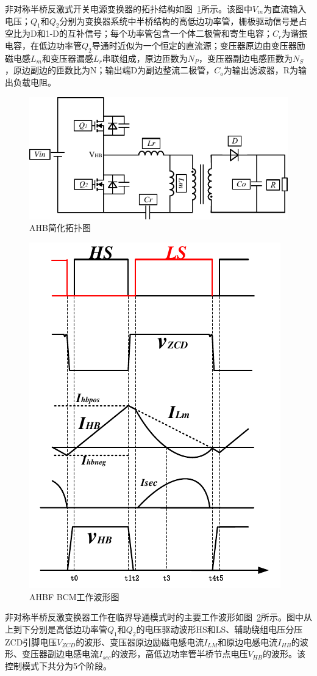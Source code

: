 非对称半桥反激式开关电源变换器的拓扑结构如图~\ref{fig:AHB简化拓扑图}所示。该图中$V_{in}$为直流输入电压；$Q_1$和$Q_2$分别为变换器系统中半桥结构的高低边功率管，栅极驱动信号是占空比为D和1-D的互补信号；每个功率管包含一个体二极管和寄生电容；$C_r$为谐振电容，在低边功率管$Q_2$导通时近似为一个恒定的直流源；变压器原边由变压器励磁电感$L_m$和变压器漏感$L_r$串联组成，原边匝数为$N_P$，变压器副边电感匝数为$N_S$，原边副边的匝数比为N；输出端D为副边整流二极管，$C_o$为输出滤波器，R为输出负载电阻。

\begin{figure}[htbp] 
    \centering
    \includegraphics[width=0.6\linewidth]{figures/AHB简化拓扑图.pdf}
    \caption{AHB简化拓扑图}
    \label{fig:AHB简化拓扑图}
\end{figure}

\begin{figure}[htbp] 
    \centering
    \includegraphics[width=0.6\linewidth]{figures/BCM工作波形图.pdf}
    \caption{AHBF BCM工作波形图}
    \label{fig:BCM工作波形图}
\end{figure}
								
非对称半桥反激变换器工作在临界导通模式时的主要工作波形如图~\ref{fig:BCM工作波形图}所示。图中从上到下分别是高低边功率管$Q_1$和$Q_2$的电压驱动波形HS和LS、辅助绕组电压分压ZCD引脚电压$V_{ZCD}$的波形、变压器原边励磁电感电流$I_{LM}$和原边电感电流$I_{HB}$的波形、变压器副边电感电流$I_{sec}$的波形，高低边功率管半桥节点电压$V_{HB}$的波形。该控制模式下共分为5个阶段。
						


